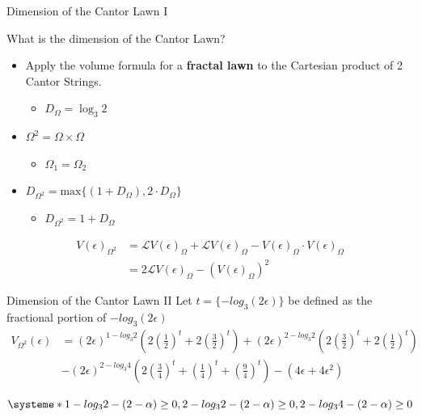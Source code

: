 \documentclass{if-beamer}
\newcommand{\SL}{\mathcal{L}}
\newcommand{\Om}{\Omega}
\begin{document}
\begin{frame}{Dimension of the Cantor Lawn I}

What is the dimension of the Cantor Lawn? \\
\pause
\begin{itemize}
\item Apply the volume formula for a {\bf fractal lawn} to the Cartesian product of 2 Cantor Strings.
	\pause
	\begin{itemize}
	\item $D_{\Om} = \log_3 2 $
	\end{itemize}
\pause 

\item $\Om^2 = \Om \times \Om $
	\pause
	\begin{itemize}
	\item $\Om_1 = \Om_2 $
	\end{itemize}
\pause

\item $D_{\Om^2} = \text{max} \{ (1 + D_{\Om}), 2 \cdot D_{\Om} \}$
	\pause
	\begin{itemize}
	\item $D_{\Om^2} = 1 + D_{\Om} $
	\end{itemize}
\end{itemize}
\pause

\begin{align*}
V(\epsilon)_{\Om^2} &= \SL V(\epsilon)_{\Om} + \SL V(\epsilon)_{\Om} - V(\epsilon)_{\Om} \cdot V(\epsilon)_{\Om} \\
&= 2 \SL V(\epsilon)_{\Om} - (V(\epsilon)_{\Om})^2
\end{align*}

\end{frame}

\begin{frame}{Dimension of the Cantor Lawn II}
	Let $t = \{-log_3 (2\epsilon)\}$ be defined as the fractional portion of $-log_3 (2\epsilon)$ 
	\begin{align*}
		V_{\Om^2}(\epsilon) &= (2\epsilon)^{1 - log_3 2} \left( 2\left(\frac{1}{2}\right)^t + 2\left(\frac{3}{2}\right)^t \right) + (2\epsilon)^{2- log_3 2} \left( 2\left(\frac{3}{2}\right)^t + 2\left(\frac{1}{2}\right)^t \right) \\
		& - (2\epsilon)^{2- log_3 4} \left( 2\left(\frac{3}{4}\right)^t + \left(\frac{1}{4}\right)^t + \left(\frac{9}{4}\right)^t \right) - (4\epsilon + 4\epsilon^2)
	\end{align*}
	\pause
	
	\[ 
	\systeme*{1- log_3 2 - (2 - \alpha) \geq 0, 2- log_3 2 - (2 - \alpha) \geq 0, 2- log_3 4 - (2 - \alpha) \geq 0}
	\]

\end{frame}
\end{document}
